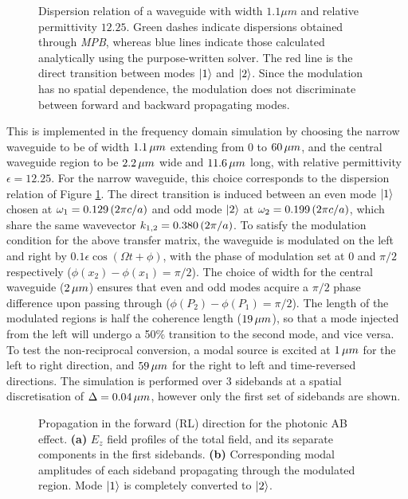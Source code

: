 \begin{figure}[t]
	\centering
	\setlength{\figH}{\textwidth}
	\setlength{\figW}{\textwidth}
	
	\caption[Dispersion relation of a waveguide of width $1.1 \mu m$ and relative permittivity $12.25$.]{Dispersion relation of a waveguide with width $1.1 \mu m$ and relative permittivity $12.25$. Green dashes indicate dispersions obtained through \textit{MPB}, whereas blue lines indicate those calculated analytically using the purpose-written solver. The red line is the direct transition between modes $\ket{1}$ and $\ket{2}$. Since the modulation has no spatial dependence, the modulation does not discriminate between forward and backward propagating modes.}
	\label{fig:banddiagram}
\end{figure}


This is implemented in the frequency domain simulation by choosing the narrow waveguide to be of width $1.1  \mskip3mu \mu m$ extending from $0$ to $60 \mskip3mu  \mu m$, and the central waveguide region to be $2.2  \mskip3mu \mu m$ wide and $11.6 \mskip3mu  \mu m$ long, with relative permittivity $\epsilon = 12.25$. For the narrow waveguide, this choice corresponds to the dispersion relation of Figure \ref{fig:banddiagram}. The direct transition is induced between an even mode $\ket{1}$ chosen at $\omega_1 = 0.129 \mskip3mu (2 \pi c/a)$ and odd mode $\ket{2}$ at $\omega_2 = 0.199  \mskip3mu (2 \pi c/a)$, which share the same wavevector $k_{1,2} = 0.380 \mskip3mu  (2 \pi / a)$. To satisfy the modulation condition for the above transfer matrix, the waveguide is modulated on the left and right by $0.1 \epsilon \cos (\Omega t + \phi)$, with the phase of modulation set at $0$ and $\pi/2$ respectively ($\phi(x_2) - \phi(x_1) = \pi/2$). The choice of width for the central waveguide ($2 \mskip3mu \mu m$) ensures that even and odd modes acquire a $\pi/2$ phase difference upon passing through ($\phi(P_2) - \phi(P_1) = \pi/2$). The length of the modulated regions is half the coherence length ($19  \mskip3mu  \mu m$), so that a mode injected from the left will undergo a 50\% transition to the second mode, and vice versa. To test the non-reciprocal conversion, a modal source is excited at $1  \mskip3mu \mu m$ for the left to right direction, and $59 \mskip3mu  \mu m$ for the right to left and time-reversed directions. The simulation is performed over 3 sidebands at a spatial discretisation of $\Delta = 0.04 \mskip3mu  \mu m$, however only the first set of sidebands are shown.

\begin{figure}[t!]
	\centering
	\setlength{\figH}{1\textwidth}
	\setlength{\figW}{1\textwidth}
	
	\caption[Modal field profiles at each sideband $n$ for the left-to-right direction]{Propagation in the forward (RL) direction for the photonic AB effect. \textbf{(a)} $E_z$ field profiles of the total field, and its separate components in the first sidebands. \textbf{(b)} Corresponding modal amplitudes of each sideband propagating through the modulated region. Mode $\ket{1}$ is completely converted to $\ket{2}$.}
	\label{fig:LRFang}
\end{figure}

